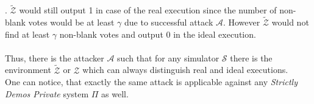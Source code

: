 \documentclass[12pt]{article}
\begin{document}
.
$\tilde{\mathcal{Z}}$ would still output 1 in case of the real execution since the number of non-blank votes would be at least $\gamma$ due to successful attack  $\mathcal{A}$. However  $\tilde{\mathcal{Z}}$ would not find at least $\gamma$ non-blank votes and output 0 in the ideal execution. \\\\
Thus, there is the attacker $\mathcal{A}$ such that for any simulator $\mathcal{S}$ there is the environment $\tilde{\mathcal{Z}}$ or $\mathcal{Z}$ which can always distinguish real and ideal executions. \\

One can notice, that exactly the same attack is applicable against any \textit{Strictly Demos Private} system $\Pi$ as well.
\end{document}
